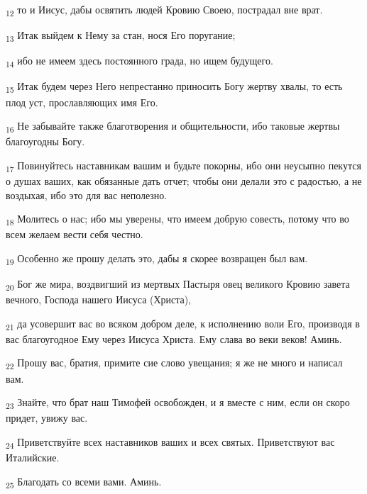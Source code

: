 \begin{tcolorbox}
\textsubscript{12} то и Иисус, дабы освятить людей Кровию Своею, пострадал вне врат.
\end{tcolorbox}
\begin{tcolorbox}
\textsubscript{13} Итак выйдем к Нему за стан, нося Его поругание;
\end{tcolorbox}
\begin{tcolorbox}
\textsubscript{14} ибо не имеем здесь постоянного града, но ищем будущего.
\end{tcolorbox}
\begin{tcolorbox}
\textsubscript{15} Итак будем через Него непрестанно приносить Богу жертву хвалы, то есть плод уст, прославляющих имя Его.
\end{tcolorbox}
\begin{tcolorbox}
\textsubscript{16} Не забывайте также благотворения и общительности, ибо таковые жертвы благоугодны Богу.
\end{tcolorbox}
\begin{tcolorbox}
\textsubscript{17} Повинуйтесь наставникам вашим и будьте покорны, ибо они неусыпно пекутся о душах ваших, как обязанные дать отчет; чтобы они делали это с радостью, а не воздыхая, ибо это для вас неполезно.
\end{tcolorbox}
\begin{tcolorbox}
\textsubscript{18} Молитесь о нас; ибо мы уверены, что имеем добрую совесть, потому что во всем желаем вести себя честно.
\end{tcolorbox}
\begin{tcolorbox}
\textsubscript{19} Особенно же прошу делать это, дабы я скорее возвращен был вам.
\end{tcolorbox}
\begin{tcolorbox}
\textsubscript{20} Бог же мира, воздвигший из мертвых Пастыря овец великого Кровию завета вечного, Господа нашего Иисуса (Христа),
\end{tcolorbox}
\begin{tcolorbox}
\textsubscript{21} да усовершит вас во всяком добром деле, к исполнению воли Его, производя в вас благоугодное Ему через Иисуса Христа. Ему слава во веки веков! Аминь.
\end{tcolorbox}
\begin{tcolorbox}
\textsubscript{22} Прошу вас, братия, примите сие слово увещания; я же не много и написал вам.
\end{tcolorbox}
\begin{tcolorbox}
\textsubscript{23} Знайте, что брат наш Тимофей освобожден, и я вместе с ним, если он скоро придет, увижу вас.
\end{tcolorbox}
\begin{tcolorbox}
\textsubscript{24} Приветствуйте всех наставников ваших и всех святых. Приветствуют вас Италийские.
\end{tcolorbox}
\begin{tcolorbox}
\textsubscript{25} Благодать со всеми вами. Аминь.
\end{tcolorbox}
